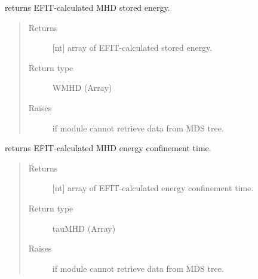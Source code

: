 \documentclass[letterpaper,10pt,english]{sphinxmanual}
\begin{document}
\begin{fulllineitems}
\begin{fulllineitems}
\begin{quote}
\begin{description}
\end{description}\end{quote}

\end{fulllineitems}


\begin{fulllineitems}
\label{\detokenize{eqtools:eqtools.EFIT.EFITTree.getWMHD}}
returns EFIT-calculated MHD stored energy.
\begin{quote}\begin{description}
\item[{Returns}] \leavevmode
{[}nt{]} array of EFIT-calculated stored energy.

\item[{Return type}] \leavevmode
WMHD (Array)

\item[{Raises}] \leavevmode
{} \textendash{} if module cannot retrieve data from MDS tree.

\end{description}\end{quote}

\end{fulllineitems}


\begin{fulllineitems}
\label{\detokenize{eqtools:eqtools.EFIT.EFITTree.getTauMHD}}
returns EFIT-calculated MHD energy confinement time.
\begin{quote}\begin{description}
\item[{Returns}] \leavevmode
{[}nt{]} array of EFIT-calculated energy confinement time.

\item[{Return type}] \leavevmode
tauMHD (Array)

\item[{Raises}] \leavevmode
{} \textendash{} if module cannot retrieve data from MDS tree.

\end{description}\end{quote}


\end{fulllineitems}
\end{fulllineitems}
\end{document}
